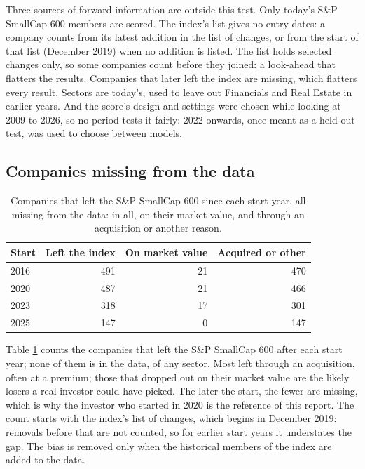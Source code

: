 \documentclass[11pt,a4paper]{article}
\begin{document}
Three sources of forward information are outside this test. Only today's S\&P SmallCap 600 members are scored. The index's list gives no entry dates: a company counts from its latest addition in the list of changes, or from the start of that list (December 2019) when no addition is listed. The list holds selected changes only, so some companies count before they joined: a look-ahead that flatters the results. Companies that later left the index are missing, which flatters every result. Sectors are today's, used to leave out Financials and Real Estate in earlier years. And the score's design and settings were chosen while looking at 2009 to 2026, so no period tests it fairly: 2022 onwards, once meant as a held-out test, was used to choose between models.

\subsection{Companies missing from the data}
\begin{table}[H]
\centering
\small
\caption{Companies that left the S\&P SmallCap 600 since each start year, all missing from the data: in all, on their market value, and through an acquisition or another reason.}\label{tab:survivors}
\begin{tabular}{l r r r}
\hline
Start & Left the index & On market value & Acquired or other \\
\hline
2016 & 491 & 21 & 470 \\
2020 & 487 & 21 & 466 \\
2023 & 318 & 17 & 301 \\
2025 & 147 & 0 & 147 \\
\hline
\end{tabular}
\end{table}
Table \ref{tab:survivors} counts the companies that left the S\&P SmallCap 600 after each start year; none of them is in the data, of any sector. Most left through an acquisition, often at a premium; those that dropped out on their market value are the likely losers a real investor could have picked. The later the start, the fewer are missing, which is why the investor who started in 2020 is the reference of this report. The count starts with the index's list of changes, which begins in December 2019: removals before that are not counted, so for earlier start years it understates the gap. The bias is removed only when the historical members of the index are added to the data.
\end{document}
